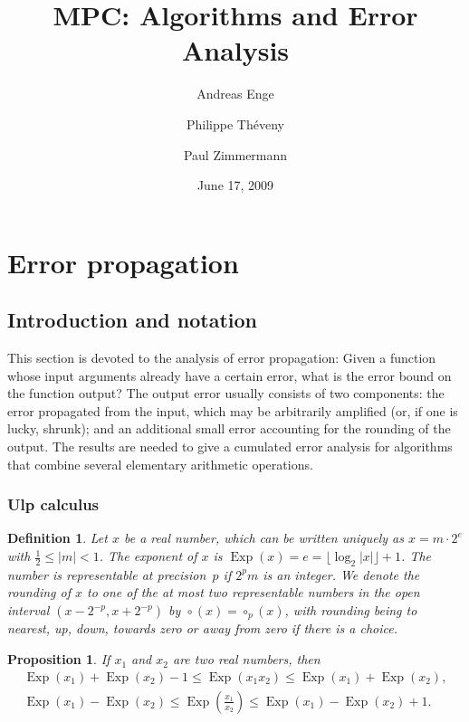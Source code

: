 \documentclass {article}
\title {MPC: Algorithms and Error Analysis}
\author {Andreas Enge \and Philippe Th\'eveny \and Paul Zimmermann}
\date {June 17, 2009}
\DeclareMathOperator{\Exp}{\operatorname {Exp}}
\newcommand {\round}{\operatorname {\circ}}
\renewcommand {\leq}{\leqslant}
\newtheorem{definition}[theorem]{Definition}
\newtheorem{prop}[theorem]{Proposition}
\begin{document}
\maketitle
\tableofcontents


\section {Error propagation}

\subsection {Introduction and notation}

This section is devoted to the analysis of error propagation: Given a function
whose input arguments already have a certain error, what is the error bound on
the function output? The output error usually consists of two components: the
error propagated from the input, which may be arbitrarily amplified (or, if
one is lucky, shrunk); and an
additional small error accounting for the rounding of the output. The results
are needed to give a cumulated error analysis for algorithms that combine
several elementary arithmetic operations.


\subsubsection {Ulp calculus}

\begin {definition}
\label {def:exp}
Let $x$ be a real number, which can be written uniquely as
$x = m \cdot 2^e$ with $\frac{1}{2} \le |m| < 1$.
The {\em exponent} of $x$ is
$\Exp(x) = e = \lfloor \log_2 |x| \rfloor + 1$.
The number is {\em representable at precision~$p$} if
$2^p m$ is an integer.
We denote the rounding of $x$ to one of the at most two representable
numbers in the open interval $(x - 2^{-p}, x + 2^{-p})$ by
$\round (x) = \round_p (x)$, with rounding being to nearest, up, down,
towards zero or away from zero if there is a choice.
\end {definition}

\begin {prop}
\label {prop:expmuldiv}
If $x_1$ and $x_2$ are two real numbers, then
\begin {gather*}
\Exp (x_1) + \Exp (x_2) - 1 \leq \Exp (x_1 x_2) \leq \Exp (x_1) + \Exp (x_2),
\\
\Exp (x_1) - \Exp (x_2) \leq \Exp \left( \frac {x_1}{x_2} \right)
\leq \Exp (x_1) - \Exp (x_2) + 1.
\end {gather*}
\end {prop}
\end{document}

